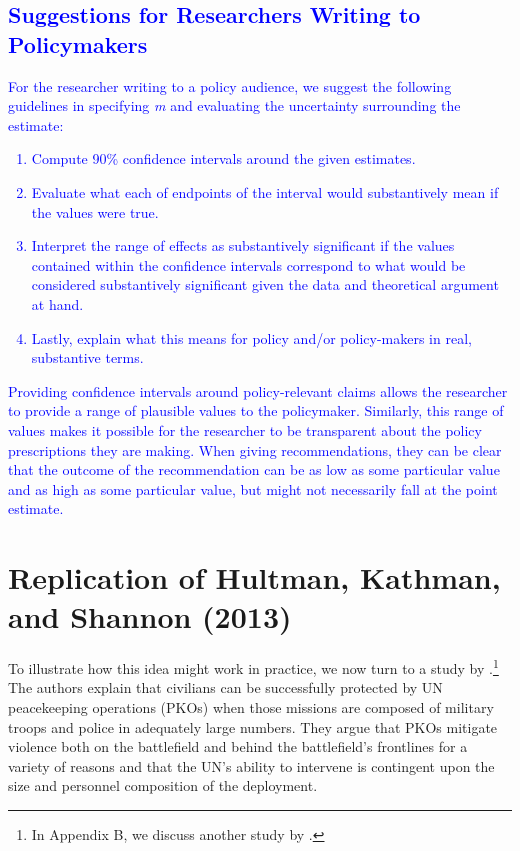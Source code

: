 \documentclass[12pt]{article}
\newcommand{\kelly}[1]{\textcolor{blue}{#1}}
\begin{document}
\kelly{
\section*{Suggestions for Researchers Writing to Policymakers}
For the researcher writing to a policy audience, we suggest the following guidelines in specifying \emph{m} and evaluating the uncertainty surrounding the estimate:
\begin{enumerate}
\item Compute 90\% confidence intervals around the given estimates. 
\item Evaluate what each of endpoints of the interval would substantively mean if the values were true.
\item Interpret the range of effects as substantively significant if the values contained within the confidence intervals correspond to what would be considered substantively significant given the data and theoretical argument at hand. 
\item Lastly, explain what this means for policy and/or policy-makers in real, substantive terms. \\
\end{enumerate}
Providing confidence intervals around policy-relevant claims allows the researcher to provide a range of plausible values to the policymaker. Similarly, this range of values makes it possible for the researcher to be transparent about the policy prescriptions they are making. When giving recommendations, they can be clear that the outcome of the recommendation can be as low as some particular value and as high as some particular value, but might not necessarily fall at the point estimate.}

\section*{Replication of Hultman, Kathman, and Shannon (2013)}

To illustrate how this idea might work in practice, we now turn to a study by \cite{HultmanKathmanShannon2013}.\footnote{In Appendix B, we discuss another study by \cite{KamZechmeister2013}.} The authors explain that civilians can be successfully protected by UN peacekeeping operations (PKOs) when those missions are composed of military troops and police in adequately large numbers. They argue that PKOs mitigate violence both on the battlefield and behind the battlefield's frontlines for a variety of reasons and that the UN's ability to intervene is contingent upon the size and personnel composition of the deployment.
\end{document}
